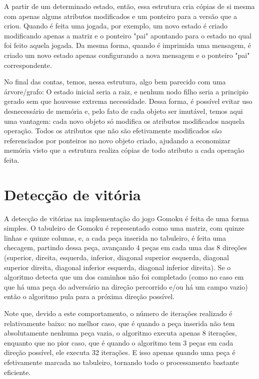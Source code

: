 \documentclass{article}
\begin{document}
    A partir de um determinado estado, então, essa estrutura cria cópias de si
    mesma com apenas alguns atributos modificados e um ponteiro para a versão
    que a criou. Quando é feita uma jogada, por exemplo, um novo estado é
    criado modificando apenas a matriz e o ponteiro "pai" apontando para o
    estado no qual foi feito aquela jogada. Da mesma forma, quando é imprimida
    uma mensagem, é criado um novo estado apenas configurando a nova mensagem e
    o ponteiro "pai" correspondente.
    
    No final das contas, temos, nessa estrutura, algo bem parecido com uma
    árvore/grafo: O estado inicial seria a raiz, e nenhum nodo filho seria a
    principio gerado sem que houvesse extrema necessidade. Dessa forma, é
    possível evitar uso desnecessário de memória e, pelo fato de cada objeto
    ser imutável, temos aqui uma vantagem: cada novo objeto só modifica os
    atributos modificados naquela operação. Todos os atributos que não são
    efetivamente modificados são referenciados por ponteiros no novo objeto
    criado, ajudando a economizar memória visto que a estrutura realiza cópias
    de todo atributo a cada operação feita.

\newpage
\section*{Detecção de vitória}
    A detecção de vitórias na implementação do jogo Gomoku é feita de uma forma
    simples. O tabuleiro de Gomoku é representado como uma matriz, com quinze
    linhas e quinze colunas, e, a cada peça inserida no tabuleiro, é feita uma
    checagem, partindo dessa peça, avançando 4 peças em cada uma das 8 direções
    (superior, direita, esquerda, inferior, diagonal superior esquerda,
    diagonal superior direita, diagonal inferior esquerda, diagonal inferior
    direita). Se o algoritmo detecta que um dos caminhos não foi completado
    (como no caso em que há uma peça do adversário na direção percorrido e/ou
    há um campo vazio) então o algoritmo pula para a próxima direção possível.
    
    Note que, devido a este comportamento, o número de iterações realizado é
    relativamente baixo: no melhor caso, que é quando a peça inserida não tem
    absolutamente nenhuma peça vazia, o algoritmo executa apenas 8 iterações,
    enquanto que no pior caso, que é quando o algoritmo tem 3 peças em cada
    direção possível, ele executa 32 iterações. E isso apenas quando uma peça é
    efetivamente marcada no tabuleiro, tornando todo o processamento bastante
    eficiente.
    
\end{document}
